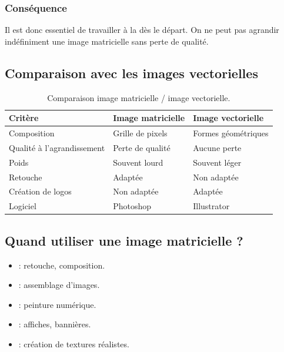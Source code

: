 \subsubsection{Conséquence}

Il est donc essentiel de travailler à la  dès le départ. On ne peut pas agrandir indéfiniment une image matricielle sans perte de qualité.

\subsection{Comparaison avec les images vectorielles}

\begin{table}[h!]
\centering
\begin{tabular}{@{}p{4cm}p{5cm}p{5cm}@{}}
\toprule
\textbf{Critère} & \textbf{Image matricielle} & \textbf{Image vectorielle} \\
\midrule
Composition & Grille de pixels & Formes géométriques \\
Qualité à l'agrandissement & Perte de qualité & Aucune perte \\
Poids & Souvent lourd & Souvent léger \\
Retouche & Adaptée & Non adaptée \\
Création de logos & Non adaptée & Adaptée \\
Logiciel & Photoshop & Illustrator \\
\bottomrule
\end{tabular}
\caption{Comparaison image matricielle / image vectorielle.}
\end{table}

\subsection{Quand utiliser une image matricielle ?}

\begin{itemize}
    \item {} : retouche, composition.
    \item {} : assemblage d'images.
    \item {} : peinture numérique.
    \item {} : affiches, bannières.
    \item {} : création de textures réalistes.
\end{itemize}

